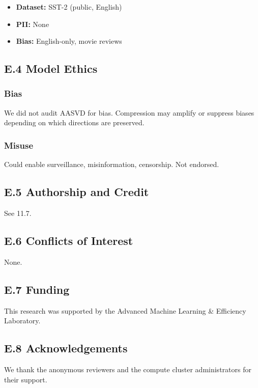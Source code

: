 \begin{itemize}
\item \textbf{Dataset:} SST-2 (public, English)
\item \textbf{PII:} None
\item \textbf{Bias:} English-only, movie reviews

\end{itemize}
\subsection{E.4 Model Ethics}

\subsubsection{Bias}

We did not audit AASVD for bias. Compression may amplify or suppress biases 
depending on which directions are preserved.

\subsubsection{Misuse}

Could enable surveillance, misinformation, censorship. Not endorsed.

\subsection{E.5 Authorship and Credit}

See  11.7.

\subsection{E.6 Conflicts of Interest}

None.

\subsection{E.7 Funding}

This research was supported by the Advanced Machine Learning \& Efficiency Laboratory.

\subsection{E.8 Acknowledgements}

We thank the anonymous reviewers and the compute cluster administrators for their support.

